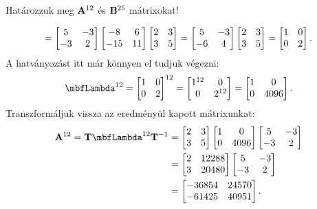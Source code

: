 \documentclass[exercise]{math-standalone}
\begin{document}
\begin{exercise}{Határozzuk meg $\mathbf{A}^{12}$ és $\mathbf{B}^{25}$ mátrixokat!}
{\[    = \begin{bmatrix}
      5  & -3 \\
      -3 & 2
    \end{bmatrix} \begin{bmatrix}
      -8  & 6  \\
      -15 & 11
    \end{bmatrix} \begin{bmatrix}
      2 & 3 \\
      3 & 5
    \end{bmatrix}
    =
    \begin{bmatrix}
      5  & -3 \\
      -6 & 4
    \end{bmatrix} \begin{bmatrix}
      2 & 3 \\
      3 & 5
    \end{bmatrix}
    =
    \begin{bmatrix}
      1 & 0 \\
      0 & 2
    \end{bmatrix}
    \text.
  \]
  A hatványozást itt már könnyen el tudjuk végezni:
  \[
    \mbfLambda^{12}
    = \begin{bmatrix} 1 & 0 \\ 0 & 2 \end{bmatrix}^{12}
    = \begin{bmatrix} 1^{12} & 0 \\ 0 & 2^{12} \end{bmatrix}
    = \begin{bmatrix} 1 & 0 \\ 0 & 4096  \end{bmatrix}
    \text.
  \]
  Transzformáljuk vissza az eredményül kapott mátrixunkat:
  \begin{align*}
    \rmat A^{12} = \rmat T \mbfLambda^{12} \rmat T^{-1}
     & =
    \begin{bmatrix} 2 & 3 \\ 3 & 5 \end{bmatrix}
    \begin{bmatrix} 1 & 0 \\ 0 & 4096 \end{bmatrix}
    \begin{bmatrix} 5  & -3 \\ -3 & 2 \end{bmatrix}
    \\
     & =
    \begin{bmatrix} 2 & 12288 \\ 3 & 20480 \end{bmatrix}
    \begin{bmatrix} 5  & -3 \\ -3 & 2 \end{bmatrix}
    \\
     & =
    \begin{bmatrix}
      -36854 & 24570 \\
      -61425 & 40951
    \end{bmatrix}
    \text.
  \end{align*}

}
\end{exercise}
\end{document}
